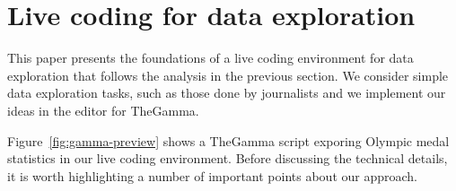 \documentclass[acmsmall,anonymous,fleqn]{acmart}\settopmatter{printfolios=false,printccs=false,printacmref=false}
\theoremstyle{plain}
\theoremstyle{definition}
\begin{document}


\section{Live coding for data exploration}



This paper presents the foundations of a live coding environment for data exploration that
follows the analysis in the previous section. We consider simple data exploration tasks, such as
those done by journalists and we implement our ideas in the editor for TheGamma.

Figure~\ref{fig:gamma-preview} shows a TheGamma script exporing Olympic medal statistics in
our live coding environment. Before discussing the technical details, it is worth highlighting
a number of important points about our approach.
\end{document}

